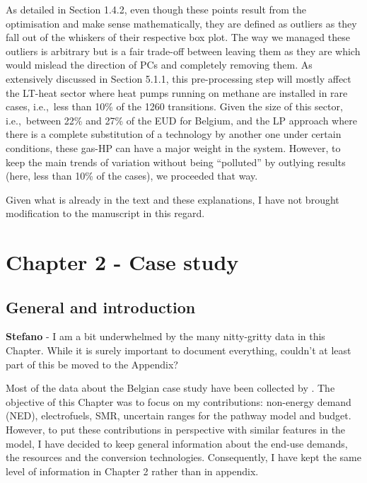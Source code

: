 \documentclass[12pt,a4paper]{article}
\def\ie{i.e.,\ }
\begin{document}
\noindent As detailed in Section 1.4.2, even though these points result from the optimisation and make sense mathematically, they are defined as outliers as they fall out of the whiskers of their respective box plot. The way we managed these outliers is arbitrary but is a fair trade-off between leaving them as they are which would mislead the direction of PCs and completely removing them. As extensively discussed in Section 5.1.1, this pre-processing step will mostly affect the LT-heat sector where heat pumps running on methane are installed in rare cases, \ie less than 10\% of the 1260 transitions. Given the size of this sector, \ie between 22\% and 27\% of the EUD for Belgium, and the LP approach where there is a complete substitution of a technology by another one under certain conditions, these gas-HP can have a major weight in the system. However, to keep the main trends of variation without being ``polluted'' by outlying results (here, less than 10\% of the cases), we proceeded that way.

Given what is already in the text and these explanations, I have not brought modification to the manuscript in this regard.

\section{Chapter 2 - Case study}
\label{case_study}

\subsection{General and introduction}
\label{methodo_general}

\begin{mdframed}[style=comment] %
{\color{orange} \textbf{Stefano}} - I am a bit underwhelmed by the many nitty-gritty data in this Chapter. While it is surely important to document everything, couldn’t at least part of this be moved to the Appendix?
\end{mdframed}

\noindent Most of the data about the Belgian case study have been collected by \citet{limpens2021generating}. The objective of this Chapter was to focus on my contributions: non-energy demand (NED), electrofuels, SMR, uncertain ranges for the pathway model and  budget. However, to put these contributions in perspective with similar features in the model, I have decided to keep general information about the end-use demands, the resources and the conversion technologies. Consequently, I have kept the same level of information in Chapter 2 rather than in appendix.
\end{document}
